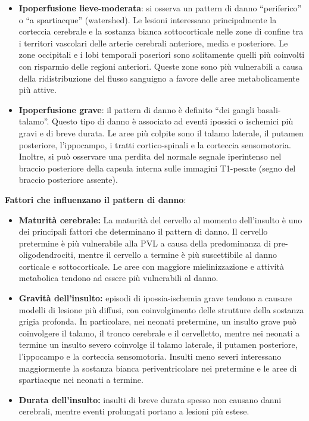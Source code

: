 \begin{itemize}
	\tightlist
	\item
	\textbf{Ipoperfusione lieve-moderata}: si osserva un pattern di danno ``periferico'' o ``a spartiacque'' (watershed). Le lesioni interessano principalmente la corteccia cerebrale e la sostanza bianca sottocorticale nelle zone di confine tra i territori vascolari delle arterie cerebrali anteriore, media e posteriore. Le zone occipitali e i lobi temporali poseriori sono solitamente quelli più coinvolti con risparmio delle regioni anteriori. Queste zone sono più vulnerabili a causa della ridistribuzione del flusso sanguigno a favore delle aree metabolicamente più attive.
	\item
	\textbf{Ipoperfusione grave}: il pattern di danno è definito ``dei gangli basali-talamo''. Questo tipo di danno è associato ad eventi ipossici o ischemici più gravi e di breve durata. Le aree più colpite sono il talamo laterale, il putamen posteriore, l'ippocampo, i tratti cortico-spinali e la corteccia sensomotoria. Inoltre, si può osservare una perdita del normale segnale iperintenso nel braccio posteriore della capsula interna sulle immagini T1-pesate (segno del braccio posteriore assente).
\end{itemize}

\textbf{Fattori che influenzano il pattern di danno}:

\begin{itemize}
	\tightlist
	\item
	\textbf{Maturità cerebrale:} La maturità del cervello al momento dell'insulto è uno dei principali fattori che determinano il pattern di danno. Il cervello pretermine è più vulnerabile alla PVL a causa della predominanza di pre-oligodendrociti, mentre il cervello a termine è più suscettibile al danno corticale e sottocorticale. Le aree con maggiore mielinizzazione e attività metabolica tendono ad essere più vulnerabili al danno.
	\item
	\textbf{Gravità dell'insulto:} episodi di ipossia-ischemia grave tendono a causare modelli di lesione più diffusi, con coinvolgimento delle strutture della sostanza grigia profonda. In particolare, nei neonati pretermine, un insulto grave può coinvolgere il talamo, il tronco cerebrale e il cervelletto, mentre nei neonati a termine un insulto severo coinvolge il talamo laterale, il putamen posteriore, l'ippocampo e la corteccia sensomotoria. Insulti meno severi interessano maggiormente la sostanza bianca periventricolare nei pretermine e le aree di spartiacque nei neonati a termine.
	\item
	\textbf{Durata dell'insulto:} insulti di breve durata spesso non causano danni cerebrali, mentre eventi prolungati portano a lesioni più estese.
\end{itemize}

